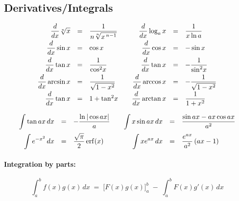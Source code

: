     \subsection{Derivatives/Integrals}
        \[
        \renewcommand{\arraystretch}{1.4}       %
        \begin{array}{@{}rcl@{\qquad}rcl@{}}
        \dfrac{d}{dx}\sqrt[n]{x} &=& \dfrac{1}{n\sqrt[n]{x^{\,n-1}}} &
        \dfrac{d}{dx}\log_a x &=& \dfrac{1}{x\ln a} \\[6pt]
        
        \dfrac{d}{dx}\sin x &=& \cos x &
        \dfrac{d}{dx}\cos x &=& -\sin x \\[6pt]
        
        \dfrac{d}{dx}\tan x &=& \dfrac{1}{\cos^{2}\!x} &
        \dfrac{d}{dx}\tan x &=& -\dfrac{1}{\sin^{2}\!x} \\[6pt]
        
        \dfrac{d}{dx}\arcsin x &=& \dfrac{1}{\sqrt{1-x^{2}}} &
        \dfrac{d}{dx}\arccos x &=& -\dfrac{1}{\sqrt{1-x^{2}}} \\[6pt]
        
        \dfrac{d}{dx}\tan x &=& 1+\tan^{2}\!x &
        \dfrac{d}{dx}\arctan x &=& \dfrac{1}{1+x^{2}}
        \end{array}
        \]
        
        \[
        \renewcommand{\arraystretch}{1.4}
        \begin{array}{@{}rcl@{\qquad}rcl@{}}
        \displaystyle \int \tan ax \, dx &=& -\dfrac{\ln|\cos ax|}{a} &
        \displaystyle \int x\sin ax \, dx &=& \dfrac{\sin ax - ax\cos ax}{a^{2}} \\[9pt]
        
        \displaystyle \int e^{-x^{2}}\,dx &=& \dfrac{\sqrt{\pi}}{2}\,\mathrm{erf}(x) &
        \displaystyle \int xe^{ax}\,dx &=& \dfrac{e^{ax}}{a^{2}}\,(ax-1)
        \end{array}
        \]
        
        \paragraph{Integration by parts:}
        \[
        \int_{a}^{b} f(x)g(x)\,dx
           \;=\;
           \bigl[F(x)g(x)\bigr]_{a}^{b}
           \;-\;
           \int_{a}^{b} F(x)g'(x)\,dx
        \]
